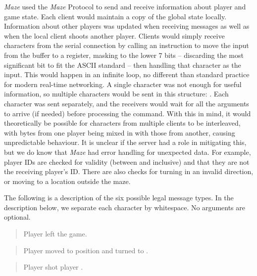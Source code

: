 \textit{Maze} used the \textit{Maze} Protocol to send and receive information about player and game state. Each client would maintain a copy of the global state locally. Information about other players was updated when receiving messages as well as when the local client shoots another player. Clients would simply receive characters from the serial connection by calling an instruction to move the input from the buffer to a register, masking to the lower 7 bits -- discarding the most significant bit to fit the ASCII standard -- then handling that character as the input. This would happen in an infinite loop, no different than standard practice for modern real-time networking. A single character was not enough for useful information, so multiple characters would be sent in this structure: . Each character was sent separately, and the receivers would wait for all the arguments to arrive (if needed) before processing the command. With this in mind, it would theoretically be possible for characters from multiple clients to be interleaved, with bytes from one player being mixed in with those from another, causing unpredictable behaviour. It is unclear if the server had a role in mitigating this, but we do know that \textit{Maze} had error handling for unexpected data. For example, player IDs are checked for validity (between  and  inclusive) and that they are not the receiving player's ID. There are also checks for turning in an invalid direction, or moving to a location outside the maze.

The following is a description of the six possible legal message types. In the description below, we separate each character by whitespace. No arguments are optional. \cite{mazesrc}

\begin{quote}

  Player  left the game.
\end{quote}

\begin{quote}

  Player  moved to position  and turned to .
\end{quote}

\begin{quote}

  Player  shot player .
\end{quote}

